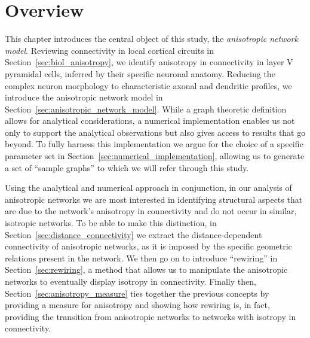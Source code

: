
\section{Overview}\label{sec:intro_model}

This chapter introduces the central object of this study, the
\textit{anisotropic network model}. Reviewing connectivity in local
cortical circuits in Section~\ref{sec:biol_anisotropy}, we identify
anisotropy in connectivity in layer V pyramidal cells, inferred by
their specific neuronal anatomy. Reducing the complex neuron
morphology to characteristic axonal and dendritic profiles, we
introduce the anisotropic network model in
Section~\ref{sec:anisotropic_network_model}.  While a graph theoretic
definition allows for analytical considerations, a numerical
implementation enables us not only to support the analytical
observations but also gives access to results that go beyond. To fully
harness this implementation we argue for the choice of a specific
parameter set in Section~\ref{sec:numerical_implementation}, allowing
us to generate a set of \enquote{sample graphs} to which we will refer
through this study.

Using the analytical and numerical approach in conjunction, in our
analysis of anisotropic networks we are most interested in identifying
structural aspects that are due to the network's anisotropy in
connectivity and do not occur in similar, isotropic networks. To be
able to make this distinction, in
Section~\ref{sec:distance_connectivity} we extract the
distance-dependent connectivity of anisotropic networks, as it is
imposed by the specific geometric relations present in the network.
We then go on to introduce \enquote{rewiring} in
Section~\ref{sec:rewiring}, a method that allows us to manipulate the
anisotropic networks to eventually display isotropy in
connectivity. Finally then, Section~\ref{sec:anisotropy_measure} ties
together the previous concepts by providing a measure for anisotropy
and showing how rewiring is, in fact, providing the transition from
anisotropic networks to networks with isotropy in connectivity.






